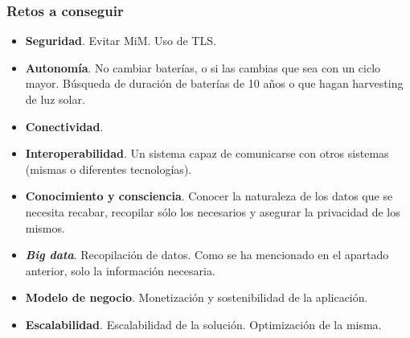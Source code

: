 \documentclass[12pt]{article}
\begin{document}
	
	
	\subsubsection{Retos a conseguir}
	\begin{itemize}
		\item \textbf{Seguridad}. Evitar MiM. Uso de TLS. 
		\item \textbf{Autonomía}. No cambiar baterías, o si las cambias que sea con un ciclo mayor. Búsqueda de duración de baterías de 10 años o que hagan harvesting de luz solar.
		\item \textbf{Conectividad}.
		\item \textbf{Interoperabilidad}. Un sistema capaz de comunicarse con otros sistemas (mismas o diferentes tecnologías).
		\item \textbf{Conocimiento y consciencia}. Conocer la naturaleza de los datos que se necesita recabar, recopilar sólo los necesarios y asegurar la privacidad de los mismos.
		\item \textbf{\textit{Big data}}. Recopilación de datos. Como se ha mencionado en el apartado anterior, solo la información necesaria.
		\item \textbf{Modelo de negocio}. Monetización y sostenibilidad de la aplicación.
		\item \textbf{Escalabilidad}. Escalabilidad de la solución. Optimización de la misma.
	\end{itemize}

	\pagebreak
\end{document}
